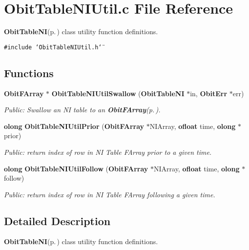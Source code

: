 \section{Obit\-Table\-NIUtil.c File Reference}
\label{ObitTableNIUtil_8c}
{\bf Obit\-Table\-NI}{\rm (p.\,\pageref{structObitTableNI})} class utility function definitions. 

{\tt \#include \char`\"{}Obit\-Table\-NIUtil.h\char`\"{}}\par
\subsection*{Functions}
\begin{CompactItemize}
\item 
{\bf Obit\-FArray} $\ast$ {\bf Obit\-Table\-NIUtil\-Swallow} ({\bf Obit\-Table\-NI} $\ast$in, {\bf Obit\-Err} $\ast$err)
\begin{CompactList}\small\item\em Public: Swallow an NI table to an {\bf Obit\-FArray}{\rm (p.\,\pageref{structObitFArray})}. \item\end{CompactList}\item 
{\bf olong} {\bf Obit\-Table\-NIUtil\-Prior} ({\bf Obit\-FArray} $\ast$NIArray, {\bf ofloat} time, {\bf olong} $\ast$prior)
\begin{CompactList}\small\item\em Public: return index of row in NI Table FArray prior to a given time. \item\end{CompactList}\item 
{\bf olong} {\bf Obit\-Table\-NIUtil\-Follow} ({\bf Obit\-FArray} $\ast$NIArray, {\bf ofloat} time, {\bf olong} $\ast$follow)
\begin{CompactList}\small\item\em Public: return index of row in NI Table FArray following a given time. \item\end{CompactList}\end{CompactItemize}


\subsection{Detailed Description}
{\bf Obit\-Table\-NI}{\rm (p.\,\pageref{structObitTableNI})} class utility function definitions. 



